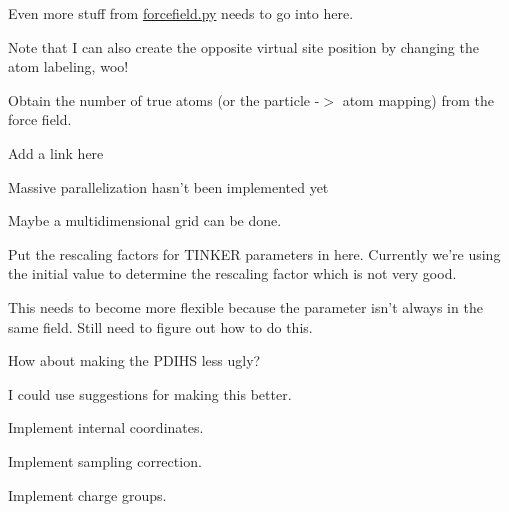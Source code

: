 \begin{DoxyRefList}
Even more stuff from \hyperlink{forcefield_8py}{forcefield.\-py} needs to go into here. 
\item[\label{todo__todo000011}%
\hypertarget{todo__todo000011}{}%
Class \hyperlink{classforcebalance_1_1gmxio_1_1ITP__Reader}{forcebalance.gmxio.I\-T\-P\-\_\-\-Reader} ]Note that I can also create the opposite virtual site position by changing the atom labeling, woo! 
\item[\label{todo__todo000013}%
\hypertarget{todo__todo000013}{}%
Member \hyperlink{classforcebalance_1_1liquid_1_1Liquid_a73a35541914580d0d918d34d94065f39}{forcebalance.liquid.Liquid.\-\_\-\-\_\-init\-\_\-\-\_\-} ]Obtain the number of true atoms (or the particle -\/$>$ atom mapping) from the force field.  
\item[\label{todo__todo000015}%
\hypertarget{todo__todo000015}{}%
Member \hyperlink{classforcebalance_1_1openmmio_1_1OpenMM__Reader_ac89322d09d53425b5151f39306f4b38b}{forcebalance.openmmio.Open\-M\-M\-\_\-\-Reader.build\-\_\-pid} ]Add a link here  
\item[\label{todo__todo000016}%
\hypertarget{todo__todo000016}{}%
Member \hyperlink{classforcebalance_1_1optimizer_1_1Optimizer_a50ffc779fbba5a99085cba45d868fc29}{forcebalance.optimizer.Optimizer.Genetic\-Algorithm} ]Massive parallelization hasn't been implemented yet 
\item[\label{todo__todo000017}%
\hypertarget{todo__todo000017}{}%
Member \hyperlink{classforcebalance_1_1optimizer_1_1Optimizer_a6c7508252398ff7e00469c4c8acb0a48}{forcebalance.optimizer.Optimizer.Scan\-\_\-\-Values} ]Maybe a multidimensional grid can be done.  
\item[\label{todo__todo000019}%
\hypertarget{todo__todo000019}{}%
Member \hyperlink{classforcebalance_1_1tinkerio_1_1Tinker__Reader_a78df181e8a2ffea7054b1915e47384b7}{forcebalance.tinkerio.Tinker\-\_\-\-Reader.feed} ]Put the rescaling factors for T\-I\-N\-K\-E\-R parameters in here. Currently we're using the initial value to determine the rescaling factor which is not very good. 
\item[\label{todo__todo000010}%
\hypertarget{todo__todo000010}{}%
Member \hyperlink{namespaceforcebalance_1_1gmxio_ae845e0b923ecde16c79f2742b94534a6}{forcebalance\-:\-:gmxio.pdict} ]This needs to become more flexible because the parameter isn't always in the same field. Still need to figure out how to do this. 

How about making the P\-D\-I\-H\-S less ugly?  
\item[\label{todo__todo000014}%
\hypertarget{todo__todo000014}{}%
Member \hyperlink{namespaceforcebalance_1_1nifty_a8d63c8ae9a67c66673a6cf81357f827d}{forcebalance\-:\-:nifty.floatornan} ]I could use suggestions for making this better.  
\item[\label{todo__todo000018}%
\hypertarget{todo__todo000018}{}%
Member \hyperlink{namespaceforcebalance_1_1parser_ac184c809737a27f35530020322431f7c}{forcebalance\-:\-:parser.parse\-\_\-inputs} ]Implement internal coordinates. 

Implement sampling correction. 

Implement charge groups. 
\end{DoxyRefList}